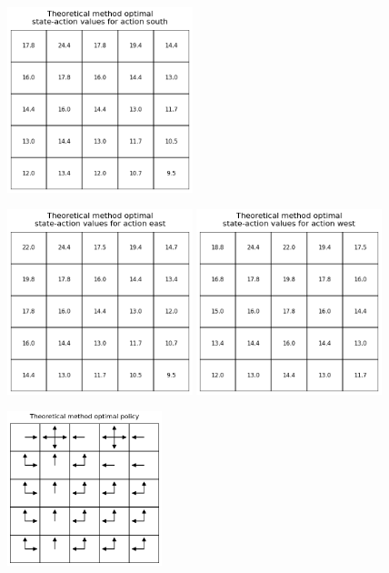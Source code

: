 \begin{homeworkProblem}
\begin{figure}[h]
    \includegraphics[width=0.48\textwidth]{./figure/p3_output/optimal/theoretical/Q_south.png}
\end{figure}
\begin{figure}[h]
    \centering
    \includegraphics[width=0.48\textwidth]{./figure/p3_output/optimal/theoretical/Q_east.png}
    \includegraphics[width=0.48\textwidth]{./figure/p3_output/optimal/theoretical/Q_west.png}
\end{figure}
\begin{figure}[!htbp]
    \centering
    \includegraphics[width=0.4\textwidth]{./figure/p3_output/optimal/theoretical/policy.png}
    \vspace{-0.5cm}
\end{figure}


\end{homeworkProblem}
